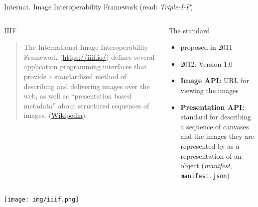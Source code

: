 \begin{frame}{Internat. Image Interoperability Framework (read: \emph{Triple-I-F})}

\begin{columns}
\begin{block}{IIIF}
\begin{quote}
    The International Image Interoperability Framework (\protect\url{https://iiif.io/}) defines several application programming interfaces that provide a standardised method of describing and delivering images over the web, as well as ``presentation based metadata'' about structured sequences of images. (\href{https://en.wikipedia.org/wiki/International_Image_Interoperability_Framework}{Wikipedia})
\end{quote}
\end{block}

\begin{block}{The standard}
\begin{itemize}\footnotesize
    \item proposed in 2011 
    \item 2012: Version 1.0
    \item \textbf{Image API:} URL for viewing the images
    \item \textbf{Presentation API:} standard for describing a sequence of canvases and the images they are represented by as a representation of an object (\emph{manifest}, \texttt{manifest.json})
\end{itemize}
\end{block}
\end{columns}

 \texttt{[image: img/iiif.png]}

\end{frame}
